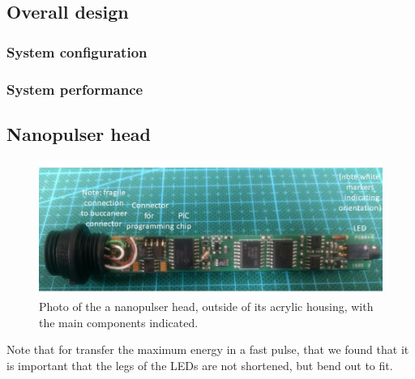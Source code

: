


\subsection*{Overall design}

%
%

\subsubsection*{System configuration}

%
%

\subsubsection*{System performance}


\subsection*{Nanopulser head}

\begin{figure}
\begin{center}	
  \includegraphics[width=1.0\linewidth]{figures/pulserhead.jpg}
  \caption{Photo of the a nanopulser head, outside of its acrylic housing, with the main components indicated.}
  \label{figure:pulserhead}
\end{center}
\end{figure}

Note that for transfer the maximum energy in a fast pulse, that we found that it is important that the legs of the LEDs are not shortened, but bend out to fit.


